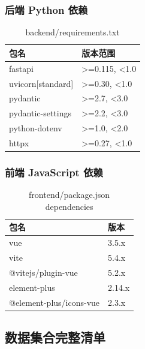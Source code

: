 \documentclass[12pt,a4paper]{ctexart}
\begin{document}
\subsubsection{后端 Python 依赖}

\begin{table}[H]
  \centering
  \caption{backend/requirements.txt}
  \label{tab:python-deps}
  \begin{tabular}{p{5cm}p{7cm}}
    \toprule
    \textbf{包名} & \textbf{版本范围} \\
    \midrule
    fastapi & >=0.115, <1.0 \\
    uvicorn[standard] & >=0.30, <1.0 \\
    pydantic & >=2.7, <3.0 \\
    pydantic-settings & >=2.2, <3.0 \\
    python-dotenv & >=1.0, <2.0 \\
    httpx & >=0.27, <1.0 \\
    \bottomrule
  \end{tabular}
\end{table}

\subsubsection{前端 JavaScript 依赖}

\begin{table}[H]
  \centering
  \caption{frontend/package.json dependencies}
  \label{tab:js-deps}
  \begin{tabular}{p{5cm}p{7cm}}
    \toprule
    \textbf{包名} & \textbf{版本} \\
    \midrule
    vue & 3.5.x \\
    vite & 5.4.x \\
    @vitejs/plugin-vue & 5.2.x \\
    element-plus & 2.14.x \\
    @element-plus/icons-vue & 2.3.x \\
    \bottomrule
  \end{tabular}
\end{table}

\subsection{数据集合完整清单}
\end{document}
